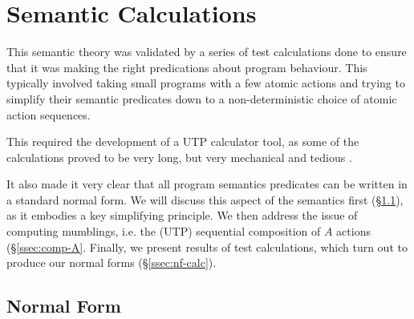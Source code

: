 \section{Semantic Calculations}\label{sec:calc}

This semantic theory was validated by a series of test calculations
done to ensure that it was making the right predications about program behaviour.
This typically involved taking small programs with a few atomic actions
and trying to simplify their semantic predicates
down to a non-deterministic choice of atomic action sequences.

This required the development of a UTP calculator tool,
as some of the calculations proved to be very long,
but very mechanical and tedious \cite{conf/utp/Butterfield16}.

It also made it very clear that all program semantics predicates can be written
in a standard normal form.
We will discuss this aspect of the semantics first (\S\ref{ssec:normal-form}),
as it embodies a key simplifying principle.
We then address the issue of computing mumblings, i.e. the (UTP)
sequential composition of $A$ actions (\S\ref{ssec:comp-A}.
Finally, we present results of test calculations,
which turn out to produce our normal forms (\S\ref{ssec:nf-calc}).

\subsection{Normal Form}\label{ssec:normal-form}


